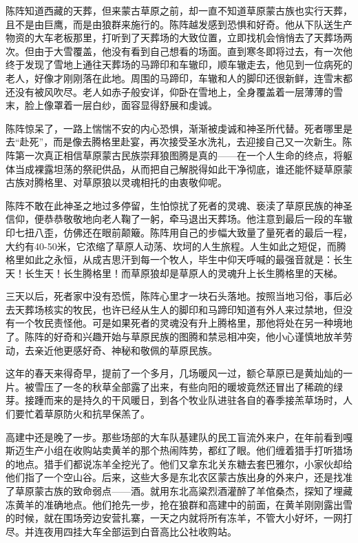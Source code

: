 \par 陈阵知道西藏的天葬，但来蒙古草原之前，却一直不知道草原蒙古族也实行天葬，且不是由巨鹰，而是由狼群来施行的。陈阵越发感到恐惧和好奇。他从下队送生产物资的大车老板那里，打听到了天葬场的大致位置，立即找机会悄悄去了天葬场两次。但由于大雪覆盖，他没有看到自己想看的场面。直到寒冬即将过去，有一次他终于发现了雪地上通往天葬场的马蹄印和车辙印，顺车辙走去，他见到一位病死的老人，好像才刚刚落在此地。周围的马蹄印，车辙和人的脚印还很新鲜，连雪末都还没有被风吹尽。老人如赤子般安详，仰卧在雪地上，全身覆盖着一层薄薄的雪末，脸上像罩着一层白纱，面容显得舒展和虔诚。
\par 陈阵惊呆了，一路上惴惴不安的内心恐惧，渐渐被虔诚和神圣所代替。死者哪里是去“赴死”，而是像去腾格里赴宴，再次接受圣水洗礼，去迎接自己又一次新生。陈阵第一次真正相信草原蒙古民族崇拜狼图腾是真的——在一个人生命的终点，将躯体当成裸露坦荡的祭祀供品，从而把自己解脱得如此干净彻底，谁还能怀疑草原蒙古族对腾格里、对草原狼以灵魂相托的由衷敬仰呢。
\par 陈阵不敢在此神圣之地过多停留，生怕惊扰了死者的灵魂、亵渎了草原民族的神圣信仰，便恭恭敬敬地向老人鞠了一躬，牵马退出天葬场。他注意到最后一段的车辙印七扭八歪，仿佛还在眼前颠簸。陈阵用自己的步幅大致量了量死者的最后一程，大约有40-50米，它浓缩了草原人动荡、坎坷的人生旅程。人生如此之短促，而腾格里如此之永恒，从成吉思汗到每一个牧人，毕生中仰天呼喊的最强音就是：长生天！长生天！长生腾格里！而草原狼却是草原人的灵魂升上长生腾格里的天梯。
\par 三天以后，死者家中没有恐慌，陈阵心里才一块石头落地。按照当地习俗，事后必去天葬场核实的牧民，也许已经从生人的脚印和马蹄印知道有外人来过禁地，但没有一个牧民责怪他。可是如果死者的灵魂没有升上腾格里，那他将处在另一种境地了。陈阵的好奇和兴趣开始与草原民族的图腾和禁忌相冲突，他小心谨慎地放羊劳动，去亲近他更感好奇、神秘和敬佩的草原民族。
\par 
\par 这年的春天来得奇早，提前了一个多月，几场暖风一过，额仑草原已是黄灿灿的一片。被雪压了一冬的秋草全部露了出来，有些向阳的暖坡竟然还冒出了稀疏的绿芽。接踵而来的是持久的干风暖日，到各个牧业队进驻各自的春季接羔草场时，人们要忙着草原防火和抗旱保羔了。
\par 高建中还是晚了一步。那些场部的大车队基建队的民工盲流外来户，在年前看到嘎斯迈生产小组在收购站卖黄羊的那个热闹阵势，都红了眼。他们缠着猎手打听猎场的地点。猎手们都说冻羊全挖光了。他们又拿东北关东糖去套巴雅尔，小家伙却给他们指了一个空山谷。后来，这些大多是东北农区蒙古族出身的外来户，还是找准了草原蒙古族的致命弱点——酒。就用东北高粱烈酒灌醉了羊倌桑杰，探知了埋藏冻黄羊的准确地点。他们抢先一步，抢在狼群和高建中的前面，在黄羊刚刚露出雪的时候，就在围场旁边安营扎寨，一天之内就将所有冻羊，不管大小好坏，一网打尽。并连夜用四挂大车全部运到白音高比公社收购站。
